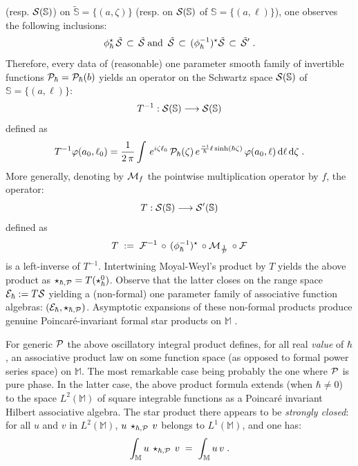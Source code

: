 \documentclass{article}
\renewcommand{\SS}{\mathbb S}
\newcommand{\MM}{\mathbb M}
\def\ce{{\cal E}}
\def\cf{{\cal F}}
\def\cm{{\cal M}}
\def\cp{{\cal P}}
\def\cs{{\cal S}}
\newcommand{\PP}{\mathcal P}
\begin{document}
(resp. $\cs({\SS})$) on $\tilde{\SS}=\{(a,\zeta)\}$ (resp. on $\cs(\SS)$ of $\SS=\{(a,\ell)\}$), one observes the following inclusions:
\begin{equation}
\phi_\hbar^\star\,\tilde{\cs}\,\subset\,\tilde{\cs}\;\mbox{\rm and }\,\tilde{\cs}\,\subset\,(\phi_\hbar^{-1})^\star\tilde{\cs}\,\subset\,\tilde{\cs}'\;.
\end{equation}
Therefore, every data of (reasonable) one parameter smooth family of invertible functions $\cp_\hbar=\cp_\hbar(b)$ yields an operator on the Schwartz space 
$\cs(\SS)$ of $\SS=\{(a,\ell)\}$:
\begin{equation}
T^{-1}:\cs(\SS)\longrightarrow\cs(\SS)
\end{equation}
defined as 
\begin{equation}\label{OpT}
T^{-1} \varphi(a_0,\ell_0)= \frac{1}{2\,\pi } \int \, e^{i\zeta \ell_0}\, \PP_\hbar(
\zeta)\, e^{\frac{-i}{\hbar}\ell \sinh(\hbar \zeta )} \, \varphi(a_0,\ell) \, {\rm d}\ell\,
{\rm d}\zeta\;.
\end{equation}
More generally, denoting by $\cm_f$ the pointwise multiplication operator by $f$, the  operator:
\begin{equation}
T:\cs(\SS)\longrightarrow\cs'(\SS)
\end{equation}
defined as
\begin{equation}
T\;:=\;\cf^{-1}\,\circ\,(\phi_\hbar^{-1})^\star\,\circ\cm_{\frac{1}{\cp}}\,\circ\cf
\end{equation}
is a left-inverse of $T^{-1}$.
Intertwining Moyal-Weyl's product by $T$ yields the above  product as $\star_{\hbar,{\cal P}} =T(\star^0_\hbar)$. Observe that the latter closes on the range space $\ce_\hbar:=T\cs$
yielding a (non-formal) one parameter family of associative  function algebras: $(\ce_\hbar,\star_{\hbar,{\cal P}} )$. Asymptotic expansions of these non-formal products produce
genuine Poincar\'e-invariant formal star products on $\MM$ \cite{BBM}.

\vspace{2mm}

\noindent For generic $\cal P$ the above oscillatory integral product defines, for all real {\sl value} of $\hbar$, an associative product law on some function space (as opposed to formal power series space) on $\MM$. The most remarkable case being probably the one where $\cal P$ is pure phase. In the latter case, the above
product formula extends (when $\hbar\neq0$) to the space $L^2(\MM)$ of square integrable functions as a Poincar\'e invariant Hilbert associative algebra. The star product there appears to be {\sl strongly closed}: for all
$u$ and $v$ in $L^2(\MM)$, $u\,\star_{\hbar,{\cal P}} \,v$ belongs to $L^1(\MM)$, and one has:
\begin{equation*}
\int_\MM u\,\star_{\hbar,{\cal P}} \,v\;=\;\int_\MM u\,v\;.
\end{equation*}
\end{document}

